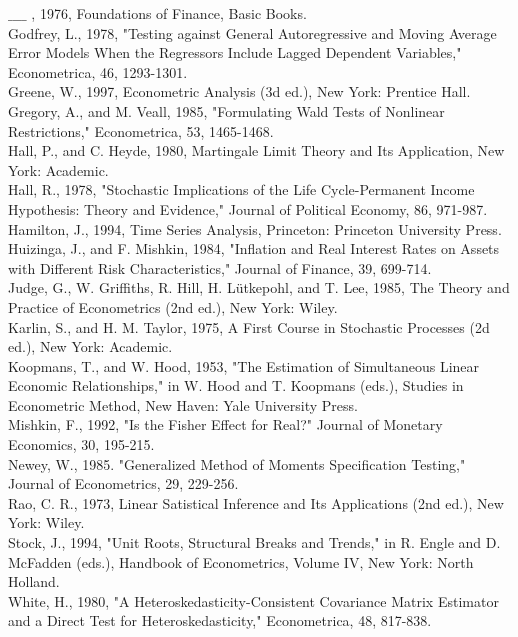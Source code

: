 \documentclass[10pt]{article}
\begin{document}
$\_\_\_\_$ , 1976, Foundations of Finance, Basic Books.\\
Godfrey, L., 1978, "Testing against General Autoregressive and Moving Average Error Models When the Regressors Include Lagged Dependent Variables," Econometrica, 46, 1293-1301.\\
Greene, W., 1997, Econometric Analysis (3d ed.), New York: Prentice Hall.\\
Gregory, A., and M. Veall, 1985, "Formulating Wald Tests of Nonlinear Restrictions," Econometrica, 53, 1465-1468.\\
Hall, P., and C. Heyde, 1980, Martingale Limit Theory and Its Application, New York: Academic.\\
Hall, R., 1978, "Stochastic Implications of the Life Cycle-Permanent Income Hypothesis: Theory and Evidence," Journal of Political Economy, 86, 971-987.\\
Hamilton, J., 1994, Time Series Analysis, Princeton: Princeton University Press.\\
Huizinga, J., and F. Mishkin, 1984, "Inflation and Real Interest Rates on Assets with Different Risk Characteristics," Journal of Finance, 39, 699-714.\\
Judge, G., W. Griffiths, R. Hill, H. Lütkepohl, and T. Lee, 1985, The Theory and Practice of Econometrics (2nd ed.), New York: Wiley.\\
Karlin, S., and H. M. Taylor, 1975, A First Course in Stochastic Processes (2d ed.), New York: Academic.\\
Koopmans, T., and W. Hood, 1953, "The Estimation of Simultaneous Linear Economic Relationships," in W. Hood and T. Koopmans (eds.), Studies in Econometric Method, New Haven: Yale University Press.\\
Mishkin, F., 1992, "Is the Fisher Effect for Real?" Journal of Monetary Economics, 30, 195-215.\\
Newey, W., 1985. "Generalized Method of Moments Specification Testing," Journal of Econometrics, 29, 229-256.\\
Rao, C. R., 1973, Linear Satistical Inference and Its Applications (2nd ed.), New York: Wiley.\\
Stock, J., 1994, "Unit Roots, Structural Breaks and Trends," in R. Engle and D. McFadden (eds.), Handbook of Econometrics, Volume IV, New York: North Holland.\\
White, H., 1980, "A Heteroskedasticity-Consistent Covariance Matrix Estimator and a Direct Test for Heteroskedasticity," Econometrica, 48, 817-838.
\end{document}
